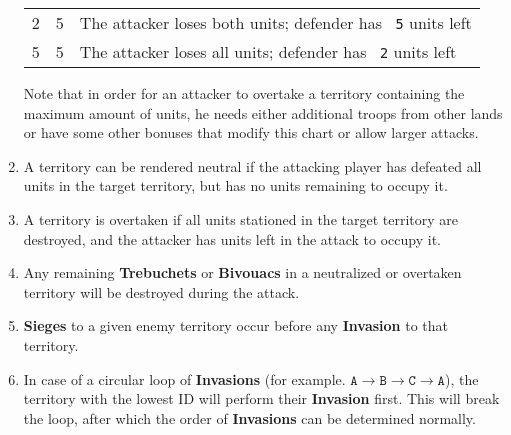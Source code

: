 \documentclass[10pt,openright,a4paper,openany]{article}
\newcommand{\num}[1]{\texttt{\color{purple} {#1}}}
\newcommand{\term}[1]{\textbf{\color{purple} #1}}
\begin{document}
\begin{enumerate}
\begin{tabular}{c|c|l}
		2 & 5 & The attacker loses both units; defender has \num{5} units left \\
		5 & 5 & The attacker loses all units; defender has \num{2} units left
	\end{tabular}
	Note that in order for an attacker to overtake a territory containing the maximum amount of units, he needs either additional troops from other lands or have some other bonuses that modify this chart or allow larger attacks.
	\item \label{rule:neutralization}A territory can be rendered neutral if the attacking player has defeated all units in the target territory, but has no units remaining to occupy it.
	\item A territory is overtaken if all units stationed in the target territory are destroyed, and the attacker has units left in the attack to occupy it.
  \item Any remaining \term{Trebuchets} or \term{Bivouacs} in a neutralized or overtaken territory will be destroyed during the attack.
	\item \term{Sieges} to a given enemy territory occur before any \term{Invasion} to that territory.
	\item In case of a circular loop of \term{Invasions} (for example. $\texttt{A} \to \texttt{B} \to \texttt{C} \to \texttt{A}$), the territory with the lowest ID will perform their \term{Invasion} first. This will break the loop, after which the order of \term{Invasions} can be determined normally.

\end{enumerate}
\end{document}
